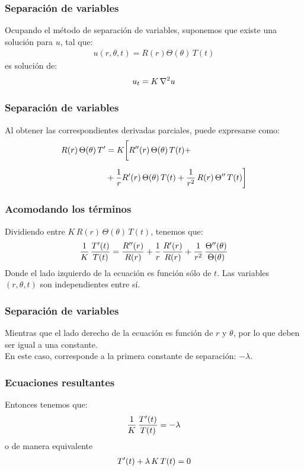 \documentclass[12pt]{beamer}
\begin{document}
\begin{frame}
\frametitle{Separación de variables}
Ocupando el método de separación de variables, suponemos que existe una solución para $u$, tal que:
\pause
\begin{align*}
u (r, \theta, t) = R(r) \Theta (\theta) \, T (t)
\end{align*}
es solución de:
\begin{align*}
u_{t} = K \, \laplacian{u}
\end{align*}
\end{frame}
\begin{frame}[fragile]
\frametitle{Separación de variables}
Al obtener las correspondientes derivadas parciales, puede expresarse como:
\begin{align*}
R(r) \, \Theta (\theta) \, T^{\prime} &= K \bigg[ {R}^{\prime \prime} (r) \, \Theta (\theta) \, T(t) + \\[0.5em]
&+ \dfrac{1}{r} {R}^{\prime} (r) \, \Theta(\theta) \, T(t) + \dfrac{1}{r^{2}} \, R(r) \, {\Theta}^{\prime \prime} \, T(t) \bigg]
\end{align*}
\end{frame}
\begin{frame}
\frametitle{Acomodando los términos}
Dividiendo entre $K \, R (r) \, \Theta (\theta) \, T (t)$, tenemos que:
\pause
\begin{align}
\dfrac{1}{K} \, \dfrac{{T}^{\prime} (t)}{T (t)} = \dfrac{{R}^{\prime \prime} (r)}{R (r)} + \dfrac{1}{r} \, \dfrac{{R}^{\prime} (r)}{R (r)} + \dfrac{1}{r^{2}} \, \dfrac{{\Theta}^{\prime \prime} (\theta)}{\Theta (\theta)}
\label{eq:ecuacion_K01}
\end{align}
\pause
Donde el lado izquierdo de la ecuación es función sólo de $t$. Las variables $(r, \theta, t)$ son independientes entre sí.
\end{frame}
\begin{frame}
\frametitle{Separación de variables}
Mientras que el lado derecho de la ecuación es función de $r$ y $\theta$, por lo que deben ser igual a una constante.
\\
\bigskip
\pause
En este caso, corresponde a la primera constante de separación: $- \lambda$.
\end{frame}
\begin{frame}
\frametitle{Ecuaciones resultantes}
Entonces tenemos que:
\begin{align*}
\dfrac{1}{K} \, \dfrac{{T}^{\prime} (t)}{T (t)} = - \lambda
\end{align*}
o de manera equivalente
\begin{align}
{T}^{\prime}(t) + \lambda \, K \, T(t) = 0
\label{eq:ecuacion_K02}    
\end{align}
\end{frame}
\end{document}

